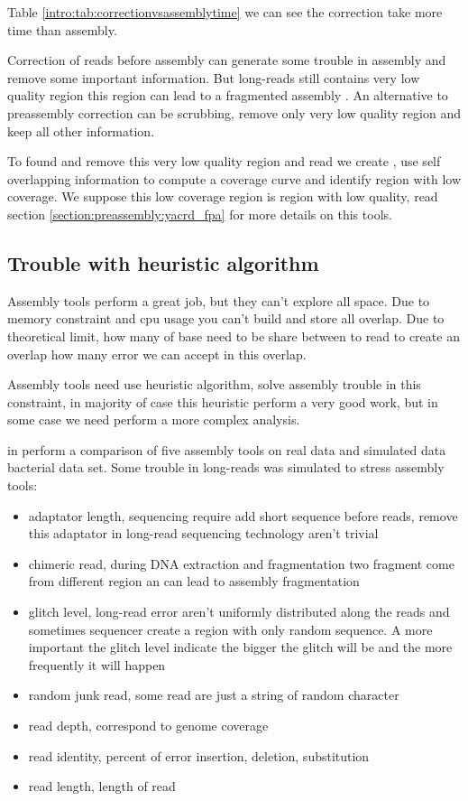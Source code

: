 \documentclass[./main.tex]{subfiles}
\begin{document}
Table \ref{intro:tab:correctionvsassemblytime} we can see the correction take more time than assembly.

Correction of reads before assembly can generate some trouble in assembly and remove some important information. But long-reads still contains very low quality region \cite{blog_post_error_repartition} this region can lead to a fragmented assembly \cite{long_read_assembler_comparison}. An alternative to preassembly correction can be scrubbing, remove only very low quality region and keep all other information.

To found and remove this very low quality region and read we create \yacrd, \yacrd use self overlapping information to compute a coverage curve and identify region with low coverage. We suppose this low coverage region is region with low quality, read section \ref{section:preassembly:yacrd_fpa} for more details on this tools.

\subsection{Trouble with heuristic algorithm}

Assembly tools perform a great job, but they can't explore all space.
Due to memory constraint and cpu usage you can't build and store all overlap.
Due to theoretical limit, how many of base need to be share between to read to create an overlap how many error we can accept in this overlap.

Assembly tools need use heuristic algorithm, solve assembly trouble in this constraint, in majority of case this heuristic perform a very good work, but in some case we need perform a more complex analysis.

\citeauthor{long_read_assembler_comparison} in \cite{long_read_assembler_comparison} perform a comparison of five assembly tools on real data and simulated data bacterial data set. Some trouble in long-reads was simulated to stress assembly tools:
\begin{itemize}
    \item adaptator length, sequencing require add short sequence before reads, remove this adaptator in long-read sequencing technology aren't trivial
    \item chimeric read, during DNA extraction and fragmentation two fragment come from different region an can lead to assembly fragmentation
    \item glitch level, long-read error aren't uniformly distributed along the reads and sometimes sequencer create a region with only random sequence. A more important the glitch level indicate the bigger the glitch will be and the more frequently it will happen
    \item random junk read, some read are just a string of random character
    \item read depth, correspond to genome coverage
    \item read identity, percent of error insertion, deletion, substitution 
    \item read length, length of read 
\end{itemize}
\end{document}
